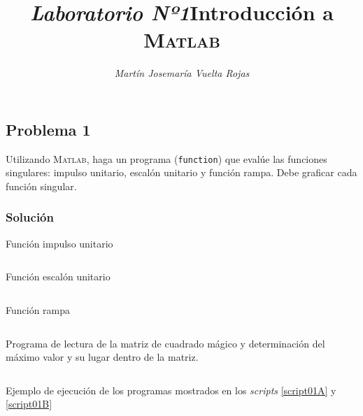 \documentclass[a4paper,12pt,final]{article}
\begin{document}
  \title{\textit{\Large Laboratorio Nº1}\linebreak{}\linebreak{}\textbf{\Huge Introducción a \textsc{Matlab}}}
  \author{\emph{Martín Josemaría Vuelta Rojas}}
  \maketitle

  \subsection*{Problema 1}
    \noindent Utilizando \textsc{Matlab}, haga un programa (\texttt{function})
    que evalúe las funciones singulares: impulso unitario, escalón unitario
    y función rampa. Debe graficar cada función singular.

    \subsubsection*{Solución}
      \begin{listing}[H]
        \caption{Función impulso unitario}
        \label{script01A}
        \inputminted{matlab}{./laboratorio_2/impulso.m}
      \end{listing}

      \begin{listing}[H]
        \caption{Función escalón unitario}
        \label{script01B}
        \inputminted{matlab}{./laboratorio_2/escalon.m}
      \end{listing}

      \begin{listing}[H]
        \caption{Función rampa}
        \label{script01C}
        \inputminted{matlab}{./laboratorio_2/rampa.m}
      \end{listing}

      \begin{listing}[H]
        \caption{Programa de lectura de la matriz de cuadrado mágico y
        determinación del máximo valor y su lugar dentro de la matriz.}
        \label{script01B}
        \inputminted[firstline=5]{matlab}{./laboratorio_1/problema01_b.m}
      \end{listing}

      \begin{listing}[H]
        \caption{Ejemplo de ejecución de los programas mostrados en los
        \emph{scripts} \ref{script01A} y \ref{script01B}}
        \label{script01sample}
        \inputminted{text}{./laboratorio_1/problema01_sample.txt}
      \end{listing}
      \vspace{\fill}
\end{document}
